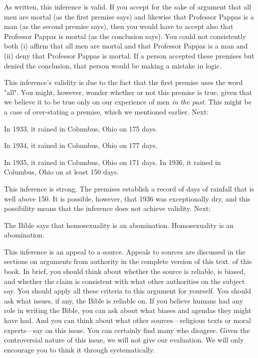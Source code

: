 As written, this inference is valid. If you accept for the sake of argument that all men are mortal (as the first premise says) and likewise that Professor Pappas is a man (as the second premise says), then you would have to accept also that Professor Pappas is mortal (as the conclusion says). You could not consistently both (i) affirm that all men are mortal and that Professor Pappas is a man and (ii) deny that Professor Pappas is mortal. If a person accepted these premises but denied the conclusion, that person would be making a mistake in logic.

This inference's validity is due to the fact that the first premise uses the word "all". You might, however, wonder whether or not this premise is true, given that we believe it to be true only on our experience of men \textit{in the past}. This might be a case of over-stating a premise, which we mentioned earlier. Next:

\begin{earg*}
\item  In 1933, it rained in Columbus, Ohio on 175 days.
\item  In 1934, it rained in Columbus, Ohio on 177 days.
\item  In 1935, it rained in Columbus, Ohio on 171 days.
\itemc  In 1936, it rained in Columbus, Ohio on at least 150 days.
\end{earg*}

This inference is strong. The premises establish a record of days of rainfall that is well above 150. It is possible, however, that 1936 was exceptionally dry, and this possibility means that the inference does not achieve validity. Next:

\begin{earg*}
\item  The Bible says that homosexuality is an abomination.
\itemc  Homosexuality is an abomination.
\end{earg*}

This inference is an appeal to a source. Appeals to sources are discussed in the sections on arguments from authority in the complete version of this text. \label{ver_var}  of this book. In brief, you should think about whether the source is reliable, is biased, and whether the claim is consistent with what other authorities on the subject say. You should apply all these criteria to this argument for yourself. You should ask what issues, if any, the Bible is reliable on. If you believe humans had any role in writing the Bible, you can ask about what biases and agendas they might have had. And you can think about what other sources---religious texts or moral experts---say on this issue. You can certainly find many who disagree. Given the controversial nature of this issue, we will not give our evaluation. We will only encourage you to think it through systematically.


